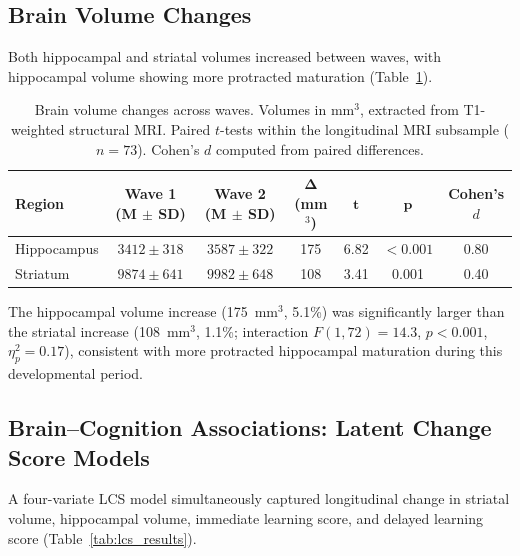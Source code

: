 \documentclass[11pt]{article}
\begin{document}
\subsection{Brain Volume Changes}

Both hippocampal and striatal volumes increased between waves, with hippocampal volume showing more protracted maturation (Table~\ref{tab:brain_volumes}).

\begin{table}[H]
\centering
\caption{Brain volume changes across waves. Volumes in mm$^3$, extracted from T1-weighted structural MRI. Paired $t$-tests within the longitudinal MRI subsample ($n = 73$). Cohen's $d$ computed from paired differences.}
\label{tab:brain_volumes}
\begin{tabular}{lcccccc}
\toprule
\textbf{Region} & \textbf{Wave 1 (M $\pm$ SD)} & \textbf{Wave 2 (M $\pm$ SD)} & $\boldsymbol{\Delta}$ \textbf{(mm$^3$)} & $\boldsymbol{t}$ & $\boldsymbol{p}$ & \textbf{Cohen's $d$} \\
\midrule
Hippocampus & $3412 \pm 318$ & $3587 \pm 322$ & 175 & 6.82 & $< 0.001$ & 0.80 \\
Striatum & $9874 \pm 641$ & $9982 \pm 648$ & 108 & 3.41 & 0.001 & 0.40 \\
\bottomrule
\end{tabular}
\end{table}

The hippocampal volume increase (175~mm$^3$, 5.1\%) was significantly larger than the striatal increase (108~mm$^3$, 1.1\%; interaction $F(1,72) = 14.3$, $p < 0.001$, $\eta^2_p = 0.17$), consistent with more protracted hippocampal maturation during this developmental period.

\subsection{Brain--Cognition Associations: Latent Change Score Models}

A four-variate LCS model simultaneously captured longitudinal change in striatal volume, hippocampal volume, immediate learning score, and delayed learning score (Table~\ref{tab:lcs_results}).
\end{document}
